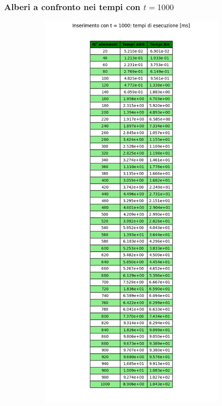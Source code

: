 \subsubsection{Alberi a confronto nei tempi con $t = 1000$}

\begin{figure}[H]
    \centering
    \begin{subfigure}[b]{0.49\textwidth}
        \centering
        \includegraphics[width=\textwidth]{tables/insert-ms-t1000.png}

\end{subfigure}
\end{figure}
